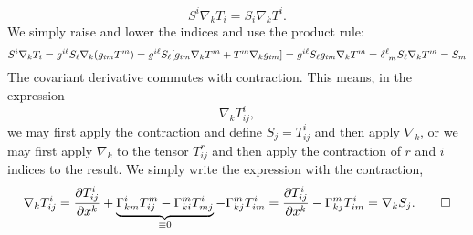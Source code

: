 \documentclass{article}
\begin{document}
\[
S^{i} \nabla_{k} T_{i} = S_{i} \nabla_{k} T^{i}.
\]
\proof We simply raise and lower the indices and use the product rule:
\[
S^{i} \nabla_{k} T_{i} = g^{i\ell} S_{\ell} \nabla_{k} \qty(g_{im} T^{m}) = g^{i\ell} S_{\ell} \qty[ g_{im} \nabla_{k} T^{m} + T^{m} \nabla_{k} g_{im} ] = g^{i\ell} S_{\ell} g_{im} \nabla_{k} T^{m} = \delta\indices{^{\ell}_{m}} S_{\ell} \nabla_{k} T^{m} = S_{m} 
\]
 The covariant derivative commutes with contraction. This means, in the expression
\[
\nabla_{k} T^{i}_{ij},
\]
we may first apply the contraction and define $ S_{j} = T^{i}_{ij} $ and then apply $ \nabla_{k} $, or we may first apply $ \nabla_{k} $ to the tensor $ T^{r}_{ij} $ and then apply the contraction of $ r $ and $ i $ indices to the result.
\proof We simply write the expression with the contraction,
\[
\nabla_{k} T^{i}_{ij} = \pdv{T^{i}_{ij}}{x^{k}} + \underbrace{\Gamma^{i}_{km} T^{m}_{ij} - \Gamma^{m}_{ki} T^{i}_{mj}}_{\equiv 0} - \Gamma^{m}_{kj} T^{i}_{im} 
= \pdv{T^{i}_{ij}}{x^{k}} - \Gamma^{m}_{kj} T^{i}_{im} 
= \nabla_{k} S_{j}. \qed
\]
\end{document}
